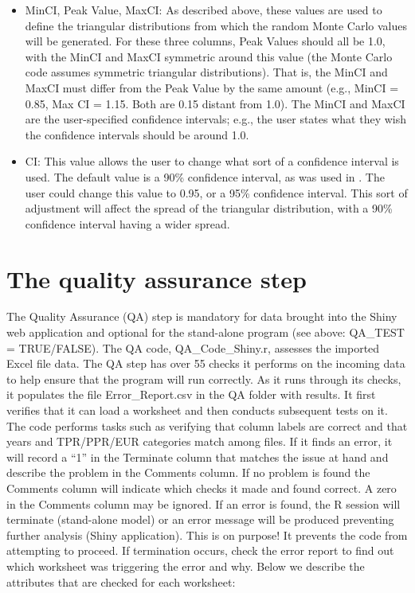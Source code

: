 \documentclass[
  openany]{book}
\begin{document}
\begin{itemize}
\item
  MinCI, Peak Value, MaxCI: As described above, these values are used to define the triangular distributions from which the random Monte Carlo values will be generated. For these three columns, Peak Values should all be 1.0, with the MinCI and MaxCI symmetric around this value (the Monte Carlo code assumes symmetric triangular distributions). That is, the MinCI and MaxCI must differ from the Peak Value by the same amount (e.g., MinCI = 0.85, Max CI = 1.15. Both are 0.15 distant from 1.0). The MinCI and MaxCI are the user-specified confidence intervals; e.g., the user states what they wish the confidence intervals should be around 1.0.
\item
  CI: This value allows the user to change what sort of a confidence interval is used. The default value is a 90\% confidence interval, as was used in \textcite{stockmann2012}. The user could change this value to 0.95, or a 95\% confidence interval. This sort of adjustment will affect the spread of the triangular distribution, with a 90\% confidence interval having a wider spread.
\end{itemize}

\hypertarget{own-qa}{%
\section{The quality assurance step}\label{own-qa}}

The Quality Assurance (QA) step is mandatory for data brought into the Shiny web application and optional for the stand-alone program (see above: QA\_TEST = TRUE/FALSE). The QA code, QA\_Code\_Shiny.r, assesses the imported Excel file data. The QA step has over 55 checks it performs on the incoming data to help ensure that the program will run correctly. As it runs through its checks, it populates the file Error\_Report.csv in the QA folder with results. It first verifies that it can load a worksheet and then conducts subsequent tests on it. The code performs tasks such as verifying that column labels are correct and that years and TPR/PPR/EUR categories match among files. If it finds an error, it will record a ``1'' in the Terminate column that matches the issue at hand and describe the problem in the Comments column. If no problem is found the Comments column will indicate which checks it made and found correct. A zero in the Comments column may be ignored. If an error is found, the R session will terminate (stand-alone model) or an error message will be produced preventing further analysis (Shiny application). This is on purpose! It prevents the code from attempting to proceed. If termination occurs, check the error report to find out which worksheet was triggering the error and why. Below we describe the attributes that are checked for each worksheet:
\end{document}
